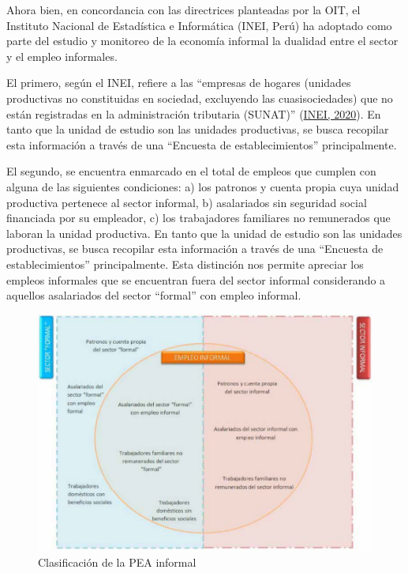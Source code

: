 \documentclass[
  letterpaper,
  12pt,
  oneside,
  spanish,
  doublespacing,
  headsepline,
  parskip]{MastersDoctoralThesis}
\begin{document}
Ahora bien, en concordancia con las directrices planteadas por la OIT,
el Instituto Nacional de Estadística e Informática (INEI, Perú) ha
adoptado como parte del estudio y monitoreo de la economía informal la
dualidad entre el sector y el empleo informales.

El primero, según el INEI, refiere a las ``empresas de hogares (unidades
productivas no constituidas en sociedad, excluyendo las cuasisociedades)
que no están registradas en la administración tributaria (SUNAT)''
(\protect\hyperlink{ref-inei2020}{INEI, 2020}). En tanto que la unidad
de estudio son las unidades productivas, se busca recopilar esta
información a través de una ``Encuesta de establecimientos''
principalmente.

El segundo, se encuentra enmarcado en el total de empleos que cumplen
con alguna de las siguientes condiciones: a) los patronos y cuenta
propia cuya unidad productiva pertenece al sector informal, b)
asalariados sin seguridad social financiada por su empleador, c) los
trabajadores familiares no remunerados que laboran la unidad productiva.
En tanto que la unidad de estudio son las unidades productivas, se busca
recopilar esta información a través de una ``Encuesta de
establecimientos'' principalmente. Esta distinción nos permite apreciar
los empleos informales que se encuentran fuera del sector informal
considerando a aquellos asalariados del sector ``formal'' con empleo
informal.

\begin{figure}

\caption{\label{fig-pea}Clasificación de la PEA informal}

{\centering \includegraphics[width=5.20833in,height=\textheight]{Chapters/../Figures/pea_informal1.pdf}

}

\end{figure}
\end{document}
